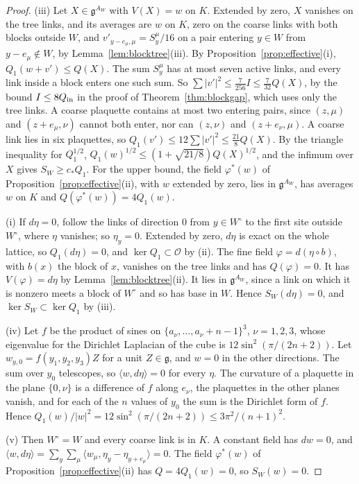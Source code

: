 \documentclass[11pt]{amsart}
\theoremstyle{definition}
\theoremstyle{remark}
\numberwithin{equation}{section}
\newcommand{\g}{\mathfrak{g}}
\newcommand{\ip}[2]{\langle #1,#2\rangle}
\begin{document}
\begin{proof}
(iii) Let $X\in\g^{A_W}$ with $V(X)=w$ on $K$. Extended by zero, $X$
vanishes on the tree links, and its averages are $w$ on $K$, zero on the
coarse links with both blocks outside $W$, and $v'_{y-e_\mu,\mu}=
S^\mu_y/16$ on a pair entering $y\in W$ from $y-e_\mu\notin W$, by
Lemma~\ref{lem:blocktree}(iii). By Proposition~\ref{prop:effective}(i),
$Q_1(w+v')\le Q(X)$. The sum $S^\mu_y$ has at most seven active links, and
every link inside a block enters one such sum. So $\sum|v'|^2\le\frac7{256}
I\le\frac7{32}Q(X)$, by the bound $I\le8Q_{\rm in}$ in the proof of
Theorem~\ref{thm:blockgap}, which uses only the tree links. A coarse
plaquette contains at most two entering pairs, since $(z,\mu)$ and $(z+e_\mu
,\nu)$ cannot both enter, nor can $(z,\nu)$ and $(z+e_\nu,\mu)$. A coarse link
lies in six plaquettes, so $Q_1(v')\le12\sum|v'|^2\le\frac{21}8Q(X)$. By the
triangle inequality for $Q_1^{1/2}$, $Q_1(w)^{1/2}\le(1+\sqrt{21/8})Q(X)^{
1/2}$, and the infimum over $X$ gives $S_W\ge c_*Q_1$. For the upper
bound, the field $\varphi^*(w)$ of Proposition~\ref{prop:effective}(ii),
with $w$ extended by zero, lies in $\g^{A_W}$, has averages $w$ on $K$ and
$Q(\varphi^*(w))=4Q_1(w)$.

(i) If $d\eta=0$, follow the links of direction $0$ from $y\in W^\circ$ to
the first site outside $W^\circ$, where $\eta$ vanishes; so $\eta_y=0$.
Extended by zero, $d\eta$ is exact on the whole lattice, so $Q_1(d\eta)=
0$, and $\ker Q_1\subset\mathcal O$ by (ii). The fine field $\varphi=d(\eta
\circ b)$, with $b(x)$ the block of $x$, vanishes on the tree links and has
$Q(\varphi)=0$. It has $V(\varphi)=d\eta$ by Lemma~\ref{lem:blocktree}(ii).
It lies in $\g^{A_W}$, since a link on which it is nonzero meets a block of
$W^\circ$ and so has base in $W$. Hence $S_W(d\eta)=0$, and $\ker S_W
\subset\ker Q_1$ by (iii).

(iv) Let $f$ be the product of sines on $\{a_\nu,\dots,a_\nu+n-1\}^3$,
$\nu=1,2,3$, whose eigenvalue for the Dirichlet Laplacian of the cube is
$12\sin^2(\pi/(2n+2))$. Let $w_{y,0}=f(y_1,y_2,y_3)Z$ for a unit $Z\in\g$,
and $w=0$ in the other directions. The sum over $y_0$ telescopes, so $\ip w
{d\eta}=0$ for every $\eta$. The curvature of a plaquette in the plane
$\{0,\nu\}$ is a difference of $f$ along $e_\nu$, the plaquettes in the other
planes vanish, and for each of the $n$ values of $y_0$ the sum is the
Dirichlet form of $f$. Hence $Q_1(w)/|w|^2=12\sin^2(\pi/(2n+2))\le3\pi^2/
(n+1)^2$.

(v) Then $W^\circ=W$ and every coarse link is in $K$. A constant field has
$dw=0$, and $\ip w{d\eta}=\sum_y\sum_\mu\ip{w_\mu}{\eta_y-\eta_{y+e_\mu}}=
0$. The field $\varphi^*(w)$ of Proposition~\ref{prop:effective}(ii) has
$Q=4Q_1(w)=0$, so $S_W(w)=0$.
\end{proof}
\end{document}
